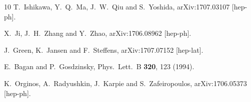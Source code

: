 \documentclass[aps,prd,twocolumn,showpacs,preprintnumbers,superscriptaddress,groupedaddress]{revtex4-1}
\begin{document}
\begin{thebibliography}{10}
  T.~Ishikawa, Y.~Q.~Ma, J.~W.~Qiu and S.~Yoshida,
  arXiv:1707.03107 [hep-ph].



  X.~Ji, J.~H.~Zhang and Y.~Zhao,
  arXiv:1706.08962 [hep-ph].



  J.~Green, K.~Jansen and F.~Steffens,
  arXiv:1707.07152 [hep-lat].



  E.~Bagan and P.~Gosdzinsky,
  Phys.\ Lett.\ B {\bf 320}, 123 (1994).



  K.~Orginos, A.~Radyushkin, J.~Karpie and S.~Zafeiropoulos,
  arXiv:1706.05373 [hep-ph].


\end{thebibliography}

 


 
\end{document}
